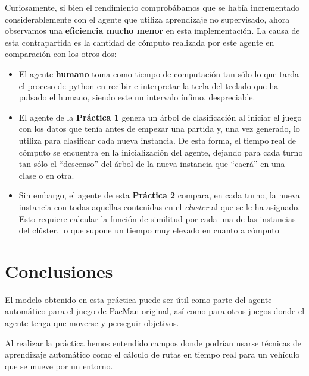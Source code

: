 \documentclass[12pt]{article}
\begin{document}
Curiosamente, si bien el rendimiento comprobábamos que se había incrementado considerablemente con el agente que utiliza aprendizaje no supervisado, ahora observamos una \textbf{eficiencia mucho menor} en esta implementación. La causa de esta contrapartida es la cantidad de cómputo realizada por este agente en comparación con los otros dos:
\begin{itemize}
    \item El agente \textbf{humano} toma como tiempo de computación tan sólo lo que tarda el proceso de python en recibir e interpretar la tecla del teclado que ha pulsado el humano, siendo este un intervalo ínfimo, despreciable.
    \item El agente de la \textbf{Práctica 1} genera un árbol de clasificación al iniciar el juego con los datos que tenía antes de empezar una partida y, una vez generado, lo utiliza para clasificar cada nueva instancia. De esta forma, el tiempo real de cómputo se encuentra en la inicialización del agente, dejando para cada turno tan sólo el ``descenso'' del árbol de la nueva instancia que ``caerá'' en una clase o en otra.
    \item Sin embargo, el agente de esta \textbf{Práctica 2} compara, en cada turno, la nueva instancia con todas aquellas contenidas en el \textit{cluster} al que se le ha asignado. Esto requiere calcular la función de similitud por cada una de las instancias del clúster, lo que supone un tiempo muy elevado en cuanto a cómputo
\end{itemize}




\newpage
\section{Conclusiones}

El modelo obtenido en esta práctica puede ser útil como parte del agente automático para el juego de PacMan original, así como para otros juegos donde el agente tenga que moverse y perseguir objetivos.

Al realizar la práctica hemos entendido campos donde podrían usarse técnicas de aprendizaje automático como el cálculo de rutas en tiempo real para un vehículo que se mueve por un entorno.
\end{document}
